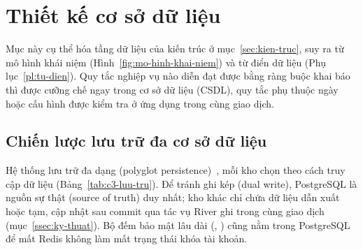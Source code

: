 \section{Thiết kế cơ sở dữ liệu}\label{sec:csdl}

Mục này cụ thể hóa tầng dữ liệu của kiến trúc ở mục~\ref{sec:kien-truc}, suy ra từ mô hình khái niệm (Hình~\ref{fig:mo-hinh-khai-niem}) và từ điển dữ liệu (Phụ lục~\ref{pl:tu-dien}). Quy tắc nghiệp vụ nào diễn đạt được bằng ràng buộc khai báo thì được cưỡng chế ngay trong cơ sở dữ liệu (CSDL), quy tắc phụ thuộc ngày hoặc cấu hình được kiểm tra ở ứng dụng trong cùng giao dịch.

\subsection{Chiến lược lưu trữ đa cơ sở dữ liệu}\label{ssec:luu-tru-da-csdl}

Hệ thống lưu trữ đa dạng (polyglot persistence)~\cite{kleppmann}, mỗi kho chọn theo cách truy cập dữ liệu (Bảng~\ref{tab:c3-luu-tru}). Để tránh ghi kép (dual write), PostgreSQL là nguồn sự thật (source of truth) duy nhất; kho khác chỉ chứa dữ liệu dẫn xuất hoặc tạm, cập nhật sau commit qua tác vụ River ghi trong cùng giao dịch (mục~\ref{ssec:ky-thuat}). Bộ đếm bảo mật lâu dài (, ) cũng nằm trong PostgreSQL để mất Redis không làm mất trạng thái khóa tài khoản.

